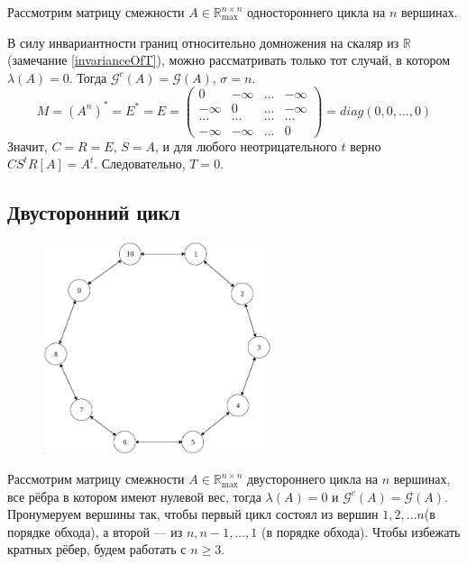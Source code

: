 \documentclass[12pt]{article}
\begin{document}
Рассмотрим матрицу смежности $A \in \mathbb{R}_{\max}^{n \times n}$ одностороннего цикла на $n$ вершинах.

В силу инвариантности границ относительно домножения на скаляр из $\mathbb{R}$ (замечание \ref{invarianceOfT}), можно рассматривать только тот случай, в котором $\lambda(A) = 0$.
Тогда $\mathcal{G}^c(A) = \mathcal{G}(A)$, $\sigma = n$.
\begin{equation*}
M = (A^n)^* = E^* = E = \begin{pmatrix}
0 & -\infty & ... & -\infty \\
-\infty & 0 & ... & -\infty \\
... & ... & ... & ... \\
-\infty & -\infty & ... & 0
\end{pmatrix} = diag(0, 0, \dots, 0)
\end{equation*}
Значит, $C = R = E$, $S = A$, и для любого неотрицательного $t$ верно $CS^tR[A] = A^t$. Следовательно, $T = 0$.

\subsection{Двусторонний цикл}
\begin{figure}[h]
  \centering
    \includegraphics[width=0.6\textwidth]{BidirectionalCycle}
\end{figure}

Рассмотрим матрицу смежности $A \in \mathbb{R}_{\max}^{n \times n}$ двустороннего цикла на $n$ вершинах, все рёбра в котором имеют нулевой вес, тогда $\lambda(A) = 0$ и $\mathcal{G}^c(A) = \mathcal{G}(A)$. Пронумеруем вершины так, чтобы первый цикл состоял из вершин $1, 2, \dots n$(в порядке обхода), а второй --- из $n, n - 1, \dots, 1$ (в порядке обхода). Чтобы избежать кратных рёбер, будем работать с $n \ge 3$.
\end{document}
